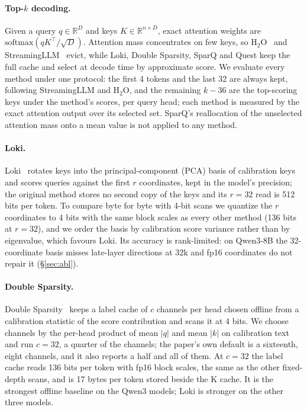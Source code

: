 \documentclass[10pt,twocolumn]{article}
\begin{document}
\paragraph{Top-$k$ decoding.} Given a query $q\in\mathbb{R}^D$ and keys $K\in\mathbb{R}^{n\times D}$, exact attention weights are $\mathrm{softmax}(qK^\top/\sqrt D)$. Attention mass concentrates on few keys, so H$_2$O~\cite{h2o} and StreamingLLM~\cite{streamingllm} evict, while Loki, Double Sparsity, SparQ and Quest keep the full cache and select at decode time by approximate score. We evaluate every method under one protocol: the first 4 tokens and the last 32 are always kept, following StreamingLLM and H$_2$O, and the remaining $k-36$ are the top-scoring keys under the method's scores, per query head; each method is measured by the exact attention output over its selected set. SparQ's reallocation of the unselected attention mass onto a mean value is not applied to any method.

\paragraph{Loki.} Loki~\cite{loki} rotates keys into the principal-component (PCA) basis of calibration keys and scores queries against the first $r$ coordinates, kept in the model's precision; the original method stores no second copy of the keys and its $r=32$ read is 512 bits per token. To compare byte for byte with 4-bit scans we quantize the $r$ coordinates to 4 bits with the same block scales as every other method (136 bits at $r=32$), and we order the basis by calibration score variance rather than by eigenvalue, which favours Loki. Its accuracy is rank-limited: on Qwen3-8B the 32-coordinate basis misses late-layer directions at 32k and fp16 coordinates do not repair it (\S\ref{sec:abl}).

\paragraph{Double Sparsity.} Double Sparsity~\cite{doublesparsity} keeps a label cache of $c$ channels per head chosen offline from a calibration statistic of the score contribution and scans it at 4 bits. We choose channels by the per-head product of mean $|q|$ and mean $|k|$ on calibration text and run $c=32$, a quarter of the channels; the paper's own default is a sixteenth, eight channels, and it also reports a half and all of them. At $c=32$ the label cache reads 136 bits per token with fp16 block scales, the same as the other fixed-depth scans, and is 17 bytes per token stored beside the K cache. It is the strongest offline baseline on the Qwen3 models; Loki is stronger on the other three models.
\end{document}
